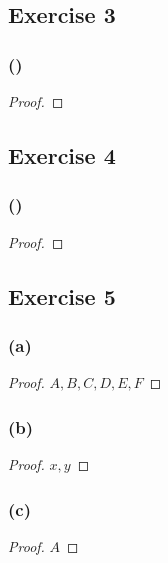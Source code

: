\documentclass[14pt]{extarticle}
\begin{document}
\subsection{Exercise 3}

\subsubsection{()}

\begin{proof}

\end{proof}

\subsection{Exercise 4}

\subsubsection{()}

\begin{proof}

\end{proof}

\subsection{Exercise 5}

\subsubsection{(a)}

\begin{proof}
\(A, B, C, D, E, F\)
\end{proof}

\subsubsection{(b)}

\begin{proof}
\(x, y\)
\end{proof}

\subsubsection{(c)}

\begin{proof}
\(A\)
\end{proof}
\end{document}
